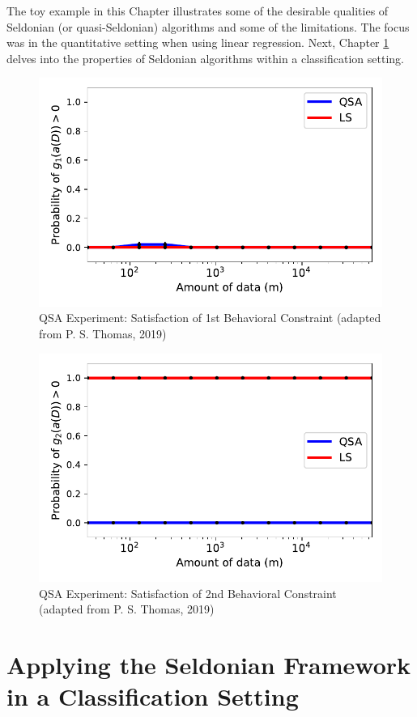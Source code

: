\documentclass[12pt, twoside]{amherstthesis}
\begin{document}
The toy example in this Chapter illustrates some of the desirable qualities of Seldonian (or quasi-Seldonian) algorithms and some of the limitations. The focus was in the quantitative setting when using linear regression. Next, Chapter \ref{chap-3} delves into the properties of Seldonian algorithms within a classification setting.
\begin{figure}

{\centering \includegraphics{Dasha-Asienga_StatThesis_files/figure-latex/fig6-5} 

}

\caption{QSA Experiment: Satisfaction of 1st Behavioral Constraint (adapted from P. S. Thomas, 2019)}\label{fig:fig6}
\end{figure}
\begin{figure}

{\centering \includegraphics{Dasha-Asienga_StatThesis_files/figure-latex/fig7-7} 

}

\caption{QSA Experiment: Satisfaction of 2nd Behavioral Constraint (adapted from P. S. Thomas, 2019)}\label{fig:fig7}
\end{figure}
\hypertarget{chap-3}{%
\chapter{Applying the Seldonian Framework in a Classification Setting}\label{chap-3}}
\end{document}
